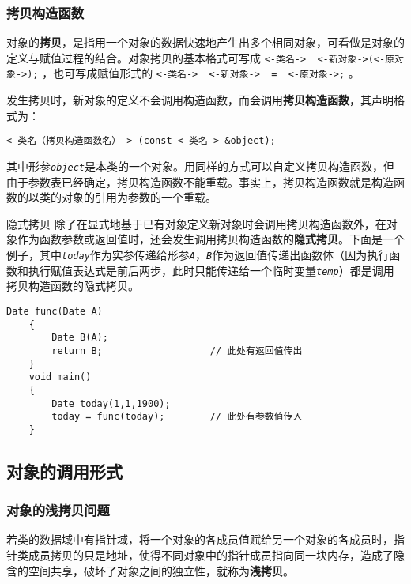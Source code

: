 \documentclass[10pt, a4paper, oneside, fontset=none]{ctexart}
\theoremstyle{plain}
\theoremstyle{definition}
\newcommand{\colors}[1]{\color{#1!75!black}}
\newcommand{\zhu}[2][]{\begin{note}{#1}\xiu #2\end{note}}
\newcommand{\tboba}[1]{\textbf{\kai\color{bali!75!black}#1}}
\newcommand{\tboqi}[1]{\textbf{\xiu\color{qinglv!75!black}#1}}
\begin{document}
\subsubsection{拷贝构造函数}
对象的\tboba{拷贝}，是指用一个对象的数据快速地产生出多个相同对象，可看做是对象的定义与赋值过程的结合。对象拷贝的基本格式可写成 \lstinline[style=intro]{<-类名->  <-新对象->(<-原对象->);} ，也可写成赋值形式的 \lstinline[style=intro]{<-类名->  <-新对象->  =  <-原对象->;} 。

发生拷贝时，新对象的定义不会调用构造函数，而会调用\tboba{拷贝构造函数}，其声明格式为：
\begin{lstlisting}[style=intro, moreemph={object}, emphstyle=\it\ttfamily, ]
	<-类名（拷贝构造函数名）-> (const <-类名-> &object);
\end{lstlisting}
其中形参\texttt{\textit{object}}是本类的一个对象。用同样的方式可以自定义拷贝构造函数，但由于参数表已经确定，拷贝构造函数不能重载。事实上，拷贝构造函数就是构造函数的以类的对象的引用为参数的一个重载。

\zhu[隐式拷贝]{
	除了在显式地基于已有对象定义新对象时会调用拷贝构造函数外，在对象作为函数参数或返回值时，还会发生调用拷贝构造函数的\tboqi{隐式拷贝}。下面是一个例子，其中\texttt{\textit{today}}作为实参传递给形参\texttt{\textit{A}}，\texttt{\textit{B}}作为返回值传递出函数体（因为执行函数和执行赋值表达式是前后两步，此时只能传递给一个临时变量\texttt{\textit{temp}}）都是调用拷贝构造函数的隐式拷贝。
	\vspace{9\baselineskip}
}
\vspace{-10\baselineskip}
\begin{lstlisting}[style=notec, moreemph={Date}, emphstyle=\colors{qinglv}, moreemph={[2]{A, B, today}}, emphstyle={[2]\it\ttfamily}, ]
	Date func(Date A)
	{
		Date B(A);
		return B;					// 此处有返回值传出
	}
	void main()
	{
		Date today(1,1,1900);
		today = func(today);		// 此处有参数值传入
	}
\end{lstlisting}
\vspace{\baselineskip}

\subsection{对象的调用形式}

\subsubsection{对象的浅拷贝问题}

若类的数据域中有指针域，将一个对象的各成员值赋给另一个对象的各成员时，指针类成员拷贝的只是地址，使得不同对象中的指针成员指向同一块内存，造成了隐含的空间共享，破坏了对象之间的独立性，就称为\tboba{浅拷贝}。
\end{document}
